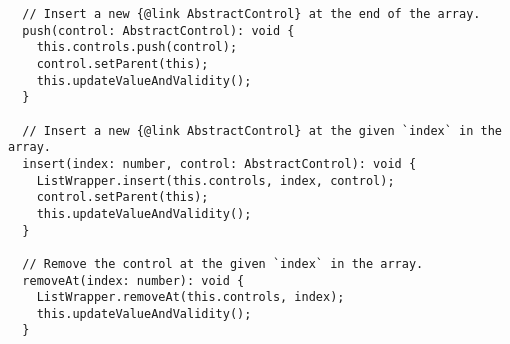 \begin{verbatim}
  // Insert a new {@link AbstractControl} at the end of the array.
  push(control: AbstractControl): void {
    this.controls.push(control);
    control.setParent(this);
    this.updateValueAndValidity();
  }

  // Insert a new {@link AbstractControl} at the given `index` in the array.
  insert(index: number, control: AbstractControl): void {
    ListWrapper.insert(this.controls, index, control);
    control.setParent(this);
    this.updateValueAndValidity();
  }

  // Remove the control at the given `index` in the array.
  removeAt(index: number): void {
    ListWrapper.removeAt(this.controls, index);
    this.updateValueAndValidity();
  }
\end{verbatim}
